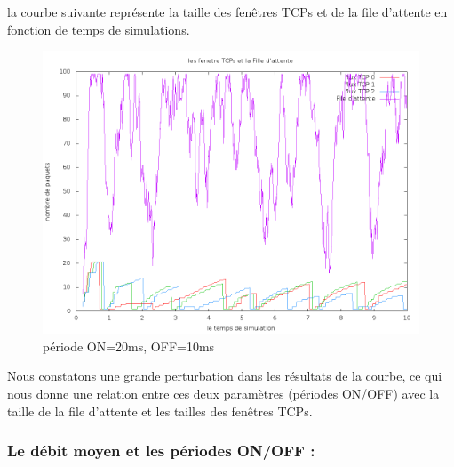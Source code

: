 \documentclass[a4paper]{report}
\theoremstyle{definition}
\begin{document}
la courbe suivante représente la taille des fenêtres TCPs et de la file d'attente en fonction de temps de simulations.  

\begin{figure}[h]
	\centering
		\includegraphics[width=450px]{graphic/rate1-5on20off10.png}
		\caption{période ON=20ms, OFF=10ms}
\end{figure}
Nous constatons une grande perturbation dans les résultats de la courbe, ce qui nous donne une relation entre ces deux paramètres (périodes ON/OFF) avec la taille de la file d'attente et les tailles des fenêtres TCPs. 

\newpage







\subsubsection*{Le débit moyen et les périodes ON/OFF  :}
\end{document}
